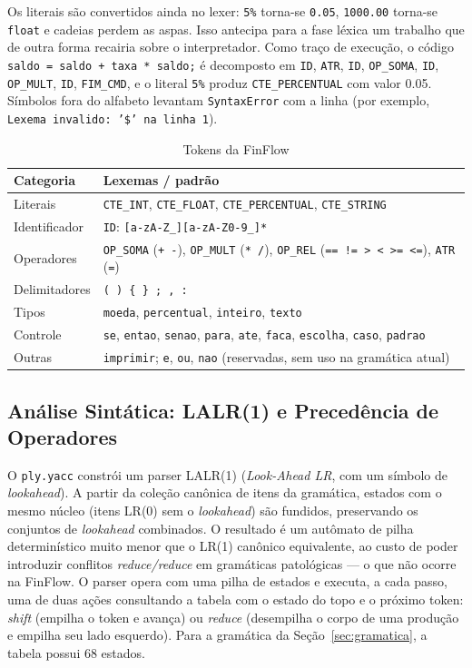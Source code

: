 \documentclass[conference]{IEEEtran}
\begin{document}
Os literais são convertidos ainda no lexer: \texttt{5\%} torna-se \texttt{0.05}, \texttt{1000.00} torna-se \texttt{float} e cadeias perdem as aspas. Isso antecipa para a fase léxica um trabalho que de outra forma recairia sobre o interpretador. Como traço de execução, o código \texttt{saldo = saldo + taxa * saldo;} é decomposto em \texttt{ID}, \texttt{ATR}, \texttt{ID}, \texttt{OP\_SOMA}, \texttt{ID}, \texttt{OP\_MULT}, \texttt{ID}, \texttt{FIM\_CMD}, e o literal \texttt{5\%} produz \texttt{CTE\_PERCENTUAL} com valor 0.05. Símbolos fora do alfabeto levantam \texttt{SyntaxError} com a linha (por exemplo, \texttt{Lexema invalido: '\$' na linha 1}).

\begin{table}[!htbp]
\caption{Tokens da FinFlow}
\label{tab:tokens}
\centering
\footnotesize
\begin{tabular}{@{}p{}p{}@{}}
\toprule
\textbf{Categoria} & \textbf{Lexemas / padrão} \\
\midrule
Literais & \texttt{CTE\_INT}, \texttt{CTE\_FLOAT}, \texttt{CTE\_PERCENTUAL}, \texttt{CTE\_STRING} \\
Identificador & \texttt{ID}: \texttt{[a-zA-Z\_][a-zA-Z0-9\_]*} \\
Operadores & \texttt{OP\_SOMA} (\texttt{+ -}), \texttt{OP\_MULT} (\texttt{* /}), \texttt{OP\_REL} (\texttt{== != > < >= <=}), \texttt{ATR} (\texttt{=}) \\
Delimitadores & \texttt{( ) \{ \} ; , :} \\
Tipos & \texttt{moeda}, \texttt{percentual}, \texttt{inteiro}, \texttt{texto} \\
Controle & \texttt{se}, \texttt{entao}, \texttt{senao}, \texttt{para}, \texttt{ate}, \texttt{faca}, \texttt{escolha}, \texttt{caso}, \texttt{padrao} \\
Outras & \texttt{imprimir}; \texttt{e}, \texttt{ou}, \texttt{nao} (reservadas, sem uso na gramática atual) \\
\bottomrule
\end{tabular}
\end{table}

\subsection{Análise Sintática: LALR(1) e Precedência de Operadores}
\label{sec:sintatico}

O \texttt{ply.yacc} constrói um parser LALR(1) (\textit{Look-Ahead LR}, com um símbolo de \textit{lookahead}). A partir da coleção canônica de itens da gramática, estados com o mesmo núcleo (itens LR(0) sem o \textit{lookahead}) são fundidos, preservando os conjuntos de \textit{lookahead} combinados. O resultado é um autômato de pilha determinístico muito menor que o LR(1) canônico equivalente, ao custo de poder introduzir conflitos \textit{reduce/reduce} em gramáticas patológicas --- o que não ocorre na FinFlow. O parser opera com uma pilha de estados e executa, a cada passo, uma de duas ações consultando a tabela com o estado do topo e o próximo token: \textit{shift} (empilha o token e avança) ou \textit{reduce} (desempilha o corpo de uma produção e empilha seu lado esquerdo). Para a gramática da Seção~\ref{sec:gramatica}, a tabela possui 68 estados.
\end{document}
